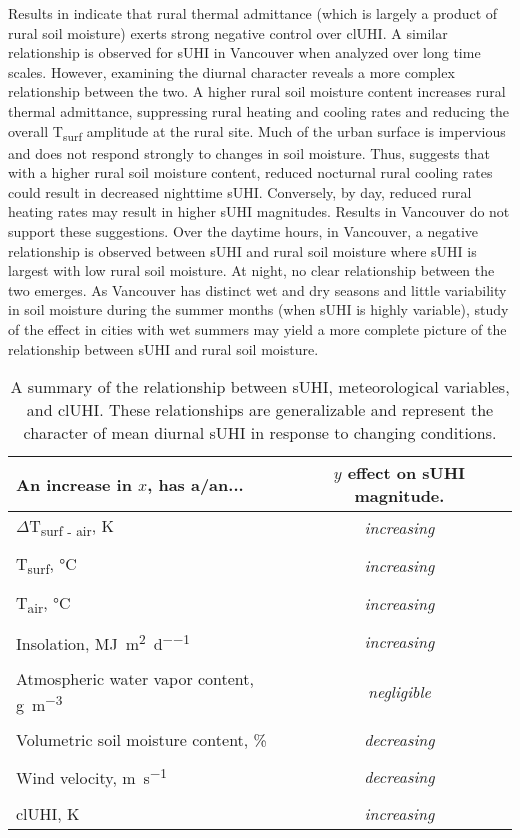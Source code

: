 \begin{bibunit}
Results in \citet{Runnalls2000} indicate that rural thermal admittance (which is largely a product of rural soil moisture) exerts strong negative control over clUHI. A similar relationship is observed for sUHI in Vancouver when analyzed over long time scales. However, examining the diurnal character reveals a more complex relationship between the two. A higher rural soil moisture content increases rural thermal admittance, suppressing rural heating and cooling rates and reducing the overall T\textsubscript{surf} amplitude at the rural site. Much of the urban surface is impervious and does not respond strongly to changes in soil moisture. Thus, \citet{Oke2017} suggests that with a higher rural soil moisture content, reduced nocturnal rural cooling rates could result in decreased nighttime sUHI. Conversely, by day, reduced rural heating rates may result in higher sUHI magnitudes. Results in Vancouver do not support these suggestions. Over the daytime hours, in Vancouver, a negative relationship is observed between sUHI and rural soil moisture where sUHI is largest with low rural soil moisture.  At night, no clear relationship between the two emerges. As Vancouver has distinct wet and dry seasons and little variability in soil moisture during the summer months (when sUHI is highly variable), study of the effect in cities with wet summers may yield a more complete picture of the relationship between sUHI and rural soil moisture. 

\begin{table}[H]
	\centering
	\caption{A summary of the relationship between sUHI, meteorological variables, and clUHI. These relationships are generalizable and represent the character of mean diurnal sUHI in response to changing conditions.}
	\label{meteo_cont}
	\begin{tabular}{lc}
		\toprule 
		An increase in $x$, has a/an... & $y$ effect on sUHI magnitude. \\
		\midrule
		$\Delta$T\textsubscript{surf - air}, \si{\kelvin} &\textit{increasing} \\
		&\\
		T\textsubscript{surf}, \si{\degreeCelsius}  & \textit{increasing} \\
		&\\
		T\textsubscript{air}, \si{\degreeCelsius} & \textit{increasing} \\
		&\\
		Insolation, \si{\mega\joule\per\meter\squared\per\day} & \textit{increasing}  \\
		& \\
		Atmospheric water vapor content, \si{\gram\per\meter\cubed} & \textit{negligible} \\
		&\\
		Volumetric soil moisture content, \si{\percent} & \textit{decreasing} \\
		&\\
		Wind velocity, \si{\meter\per\second} &\textit{decreasing} \\
		&\\
		clUHI, \si{\kelvin} &\textit{increasing} \\
		\bottomrule
	\end{tabular} 
\end{table}


\end{bibunit}
